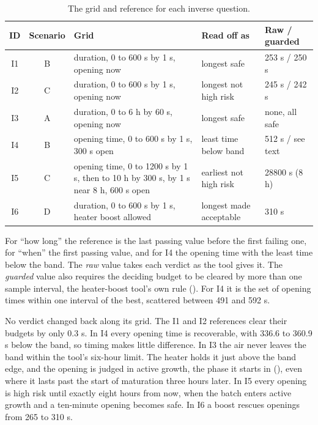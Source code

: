   \begin{table}[H]
    \centering
    \small
    \begin{tabular}{@{}ccp{4.6cm}p{3.4cm}l@{}}
      \toprule
      \textbf{ID} & \textbf{Scenario} & \textbf{Grid} & \textbf{Read off as} & \textbf{Raw / guarded} \\
      \midrule
      I1 & B & duration, 0 to 600 s by 1 s, opening now & longest safe & 253 s / 250 s \\
      I2 & C & duration, 0 to 600 s by 1 s, opening now & longest not high risk & 245 s / 242 s \\
      I3 & A & duration, 0 to 6 h by 60 s, opening now & longest safe & none, all safe \\
      I4 & B & opening time, 0 to 600 s by 1 s, 300 s open & least time below band
          & 512 s / see text \\
      I5 & C & opening time, 0 to 1200 s by 1 s, then to 10 h by 300 s, by 1 s near 8 h,
          600 s open & earliest not high risk & 28800 s (8 h) \\
      I6 & D & duration, 0 to 600 s by 1 s, heater boost allowed & longest made acceptable
          & 310 s \\
      \bottomrule
    \end{tabular}
    \caption{The grid and reference for each inverse question.}
    \label{tab:reference}
  \end{table}

  For ``how long'' the reference is the last passing value before the first failing one, for
  ``when'' the first passing value, and for I4 the opening time with the least time below the
  band. The \emph{raw} value takes each verdict as the tool gives it. The \emph{guarded} value also
  requires the deciding budget to be cleared by more than one sample interval, the heater-boost
  tool's own rule (). For I4 it is the set of opening times within one interval of
  the best, scattered between 491 and 592 s.

  No verdict changed back along its grid. The I1 and I2 references clear their budgets by only
  0.3 s. In I4 every opening time is recoverable, with 336.6 to 360.9 s below the band, so timing
  makes little difference. In I3 the air never leaves the band within the tool's six-hour limit. The heater
  holds it just above the band edge, and the opening is judged in active growth, the phase it
  starts in (), even where it lasts past the start of maturation three hours
  later.
  In I5 every opening is high risk until exactly eight hours from now, when the batch enters active
  growth and a ten-minute opening becomes safe. In I6 a boost rescues openings from 265 to 310 s.

